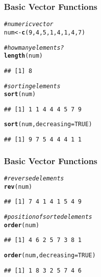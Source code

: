 \documentclass[12pt]{beamer}\usepackage[]{graphicx}\usepackage[]{color}
\makeatletter
\newcommand{\hlnum}[1]{\textcolor[rgb]{0.686,0.059,0.569}{#1}}%
\newcommand{\hlcom}[1]{\textcolor[rgb]{0.678,0.584,0.686}{\textit{#1}}}%
\newcommand{\hlstd}[1]{\textcolor[rgb]{0.345,0.345,0.345}{#1}}%
\newcommand{\hlkwb}[1]{\textcolor[rgb]{0.69,0.353,0.396}{#1}}%
\newcommand{\hlkwc}[1]{\textcolor[rgb]{0.333,0.667,0.333}{#1}}%
\newcommand{\hlkwd}[1]{\textcolor[rgb]{0.737,0.353,0.396}{\textbf{#1}}}%
\newenvironment{kframe}{%
 \def\at@end@of@kframe{}%
 \ifinner\ifhmode%
  \def\at@end@of@kframe{\end{minipage}}%
  \begin{minipage}{\columnwidth}%
 \fi\fi%
 \def\FrameCommand##1{\hskip\@totalleftmargin \hskip-\fboxsep
 \colorbox{shadecolor}{##1}\hskip-\fboxsep
     \hskip-\linewidth \hskip-\@totalleftmargin \hskip\columnwidth}%
 \MakeFramed {\advance\hsize-\width
   \@totalleftmargin\z@ \linewidth\hsize
   \@setminipage}}%
 {\par\unskip\endMakeFramed%
 \at@end@of@kframe}
\newenvironment{knitrout}{}{} %
\makeatother
\begin{document}
\begin{frame}[fragile]
\frametitle{Basic Vector Functions}

\begin{knitrout}\footnotesize
{}\color{fgcolor}\begin{kframe}
\begin{alltt}
\hlcom{# numeric vector}
\hlstd{num} \hlkwb{<-} \hlkwd{c}\hlstd{(}\hlnum{9}\hlstd{,} \hlnum{4}\hlstd{,} \hlnum{5}\hlstd{,} \hlnum{1}\hlstd{,} \hlnum{4}\hlstd{,} \hlnum{1}\hlstd{,} \hlnum{4}\hlstd{,} \hlnum{7}\hlstd{)}

\hlcom{# how many elements?}
\hlkwd{length}\hlstd{(num)}
\end{alltt}
\begin{verbatim}
## [1] 8
\end{verbatim}
\begin{alltt}
\hlcom{# sorting elements}
\hlkwd{sort}\hlstd{(num)}
\end{alltt}
\begin{verbatim}
## [1] 1 1 4 4 4 5 7 9
\end{verbatim}
\begin{alltt}
\hlkwd{sort}\hlstd{(num,} \hlkwc{decreasing} \hlstd{=} \hlnum{TRUE}\hlstd{)}
\end{alltt}
\begin{verbatim}
## [1] 9 7 5 4 4 4 1 1
\end{verbatim}
\end{kframe}
\end{knitrout}

\end{frame}


\begin{frame}[fragile]
\frametitle{Basic Vector Functions}

\begin{knitrout}\footnotesize
{}\color{fgcolor}\begin{kframe}
\begin{alltt}
\hlcom{# reversed elements}
\hlkwd{rev}\hlstd{(num)}
\end{alltt}
\begin{verbatim}
## [1] 7 4 1 4 1 5 4 9
\end{verbatim}
\begin{alltt}
\hlcom{# position of sorted elements}
\hlkwd{order}\hlstd{(num)}
\end{alltt}
\begin{verbatim}
## [1] 4 6 2 5 7 3 8 1
\end{verbatim}
\begin{alltt}
\hlkwd{order}\hlstd{(num,} \hlkwc{decreasing} \hlstd{=} \hlnum{TRUE}\hlstd{)}
\end{alltt}
\begin{verbatim}
## [1] 1 8 3 2 5 7 4 6
\end{verbatim}
\end{kframe}
\end{knitrout}

\end{frame}
\end{document}
